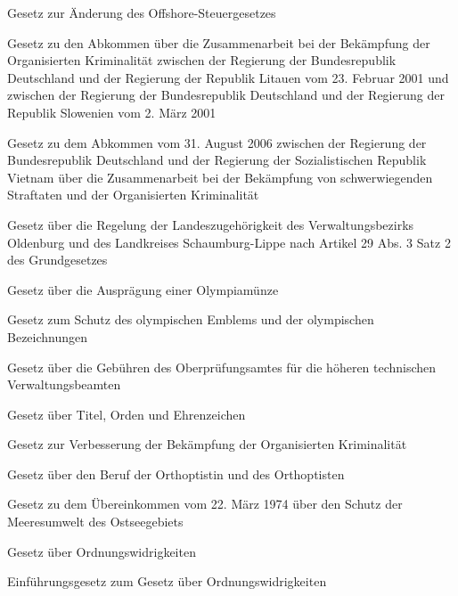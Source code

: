 \item[{OffshStAbkGÄndG}] Gesetz zur Änderung des Offshore-Steuergesetzes

\item[{OKZusAAbkLTU-SVNG}] Gesetz zu den Abkommen über die Zusammenarbeit bei der Bekämpfung der Organisierten Kriminalität zwischen der Regierung der Bundesrepublik Deutschland und der Regierung der Republik Litauen vom 23. Februar 2001 und zwischen der Regierung der Bundesrepublik Deutschland und der Regierung der Republik Slowenien vom 2. März 2001

\item[{OKZusAAbkVNMG}] Gesetz zu dem Abkommen vom 31. August 2006 zwischen der Regierung der Bundesrepublik Deutschland und der Regierung der Sozialistischen Republik Vietnam über die Zusammenarbeit bei der Bekämpfung von schwerwiegenden Straftaten und der Organisierten Kriminalität

\item[{OldenbG}] Gesetz über die Regelung der Landeszugehörigkeit des Verwaltungsbezirks Oldenburg und des Landkreises Schaumburg-Lippe nach Artikel 29 Abs. 3 Satz 2 des Grundgesetzes

\item[{OlympiaMünzG}] Gesetz über die Ausprägung einer Olympiamünze

\item[{OlympSchG}] Gesetz zum Schutz des olympischen Emblems und der olympischen Bezeichnungen

\item[{OPrAGebG}] Gesetz über die Gebühren des Oberprüfungsamtes für die höheren technischen Verwaltungsbeamten

\item[{OrdenG}] Gesetz über Titel, Orden und Ehrenzeichen

\item[{OrgKVerbG}] Gesetz zur Verbesserung der Bekämpfung der Organisierten Kriminalität

\item[{OrthoptG}] Gesetz über den Beruf der Orthoptistin und des Orthoptisten

\item[{OstSUmwSchÜbkG}] Gesetz zu dem Übereinkommen vom 22. März 1974 über den Schutz der Meeresumwelt des Ostseegebiets

\item[{OWiG-1968}] Gesetz über Ordnungswidrigkeiten

\item[{OWiGEG}] Einführungsgesetz zum Gesetz über Ordnungswidrigkeiten

